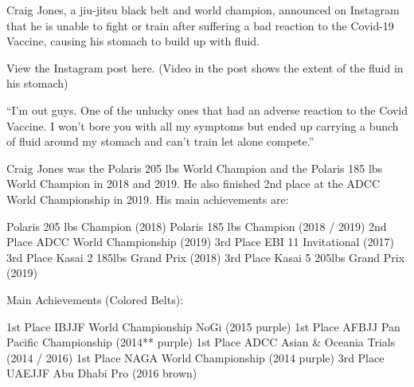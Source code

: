 Craig Jones, a jiu-jitsu black belt and world champion, announced on Instagram
that he is unable to fight or train after suffering a bad reaction to the
Covid-19 Vaccine, causing his stomach to build up with fluid.

View the Instagram post here. (Video in the post shows the extent of the fluid
in his stomach)

“I’m out guys. One of the unlucky ones that had an adverse reaction to the Covid
Vaccine. I won’t bore you with all my symptoms but ended up carrying a bunch of
fluid around my stomach and can’t train let alone compete.”

Craig Jones was the Polaris 205 lbs World Champion and the Polaris 185 lbs World
Champion in 2018 and 2019. He also finished 2nd place at the ADCC World
Championship in 2019. His main achievements are:

Polaris 205 lbs Champion (2018) Polaris 185 lbs Champion (2018 / 2019) 2nd Place
ADCC World Championship (2019) 3rd Place EBI 11 Invitational (2017) 3rd Place
Kasai 2 185lbs Grand Prix (2018) 3rd Place Kasai 5 205lbs Grand Prix (2019)

Main Achievements (Colored Belts):

1st Place IBJJF World Championship NoGi (2015 purple) 1st Place AFBJJ Pan
Pacific Championship (2014** purple) 1st Place ADCC Asian \& Oceania Trials (2014
/ 2016) 1st Place NAGA World Championship (2014 purple) 3rd Place UAEJJF Abu
Dhabi Pro (2016 brown)

